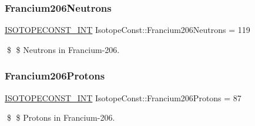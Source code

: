 \subsubsection{\texorpdfstring{Francium206\+Neutrons}{Francium206Neutrons}}
{\footnotesize\ttfamily \mbox{\hyperlink{group___isotope_const-_macros_ga5f18360b3e99483a35c32d789e62621c}{I\+S\+O\+T\+O\+P\+E\+C\+O\+N\+S\+T\+\_\+\+I\+NT}} Isotope\+Const\+::\+Francium206\+Neutrons = 119}

\$ \$ Neutrons in Francium-\/206. \mbox{\label{group___isotope_const-_francium-_fr206_ga31b3b5f433270985cfadc089f170fc66}} 
\subsubsection{\texorpdfstring{Francium206\+Protons}{Francium206Protons}}
{\footnotesize\ttfamily \mbox{\hyperlink{group___isotope_const-_macros_ga5f18360b3e99483a35c32d789e62621c}{I\+S\+O\+T\+O\+P\+E\+C\+O\+N\+S\+T\+\_\+\+I\+NT}} Isotope\+Const\+::\+Francium206\+Protons = 87}

\$ \$ Protons in Francium-\/206. 